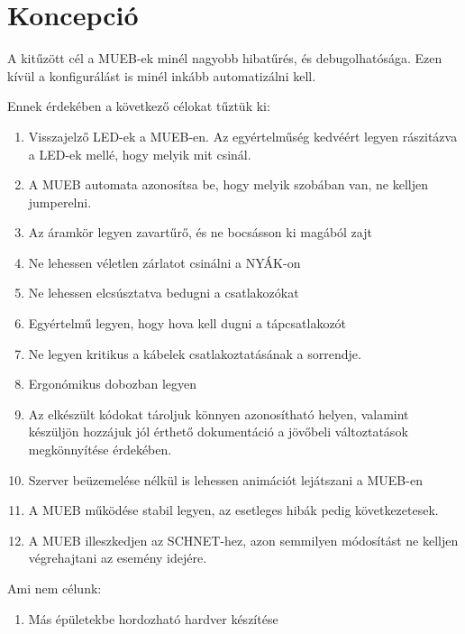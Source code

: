 \chapter{Koncepció}

A kitűzött cél a MUEB-ek minél nagyobb hibatűrés, és debugolhatósága. Ezen kívül a konfigurálást is minél inkább automatizálni kell.
\par
Ennek érdekében a következő célokat tűztük ki:
\begin{enumerate}
 \item Visszajelző LED-ek a MUEB-en. Az egyértelműség kedvéért legyen rászitázva a LED-ek mellé, hogy melyik mit csinál.
 \item A MUEB automata azonosítsa be, hogy melyik szobában van, ne kelljen jumperelni.
 \item Az áramkör legyen zavartűrő, és ne bocsásson ki magából zajt
 \item Ne lehessen véletlen zárlatot csinálni a NYÁK-on
 \item Ne lehessen elcsúsztatva bedugni a csatlakozókat
 \item Egyértelmű legyen, hogy hova kell dugni a tápcsatlakozót
 \item Ne legyen kritikus a kábelek csatlakoztatásának a sorrendje.
 \item Ergonómikus dobozban legyen
 \item Az elkészült kódokat tároljuk könnyen azonosítható helyen, valamint készüljön hozzájuk jól érthető dokumentáció a jövőbeli változtatások megkönnyítése érdekében.
 \item Szerver beüzemelése nélkül is lehessen animációt lejátszani a MUEB-en
 \item A MUEB működése stabil legyen, az esetleges hibák pedig következetesek.
 \item A MUEB illeszkedjen az SCHNET-hez, azon semmilyen módosítást ne kelljen végrehajtani az esemény idejére.
\end{enumerate}
Ami nem célunk:
\begin{enumerate}
 \item Más épületekbe hordozható hardver készítése
\end{enumerate}
